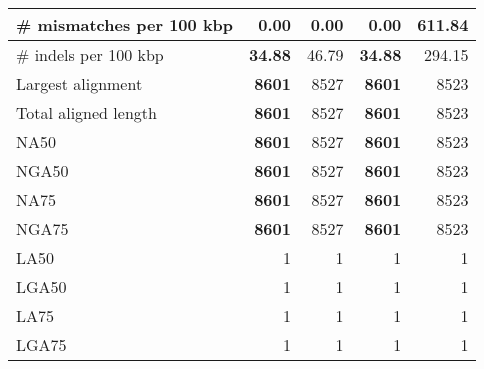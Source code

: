 \documentclass[12pt,a4paper]{article}
\begin{document}
\begin{table}[ht]
\begin{center}
\begin{tabular}{|l*{4}{|r}|}
\# mismatches per 100 kbp & {\bf 0.00} & {\bf 0.00} & {\bf 0.00} & 611.84 \\ \hline
\# indels per 100 kbp & {\bf 34.88} & 46.79 & {\bf 34.88} & 294.15 \\ \hline
Largest alignment & {\bf 8601} & 8527 & {\bf 8601} & 8523 \\ \hline
Total aligned length & {\bf 8601} & 8527 & {\bf 8601} & 8523 \\ \hline
NA50 & {\bf 8601} & 8527 & {\bf 8601} & 8523 \\ \hline
NGA50 & {\bf 8601} & 8527 & {\bf 8601} & 8523 \\ \hline
NA75 & {\bf 8601} & 8527 & {\bf 8601} & 8523 \\ \hline
NGA75 & {\bf 8601} & 8527 & {\bf 8601} & 8523 \\ \hline
LA50 & 1 & 1 & 1 & 1 \\ \hline
LGA50 & 1 & 1 & 1 & 1 \\ \hline
LA75 & 1 & 1 & 1 & 1 \\ \hline
LGA75 & 1 & 1 & 1 & 1 \\ \hline
\end{tabular}
\end{center}
\end{table}
\end{document}
